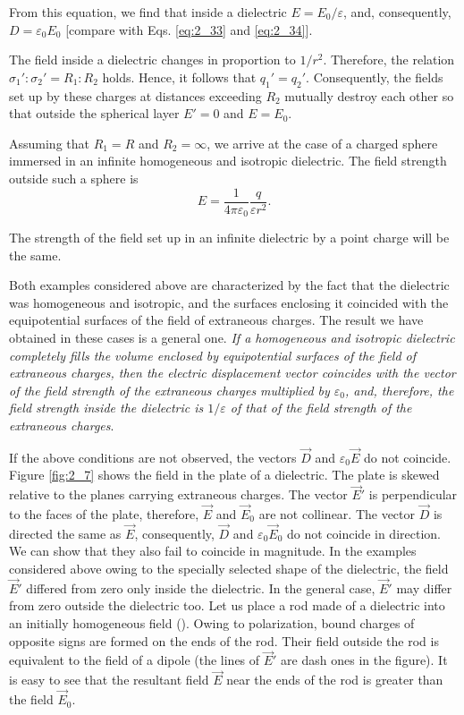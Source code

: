 \noindent
From this equation, we find that inside a dielectric $E=E_0/\varepsilon$, and, consequently, $D=\varepsilon_0E_0$ [compare with Eqs. \eqref{eq:2_33} and \eqref{eq:2_34}].

The field inside a dielectric changes in proportion to $1/r^2$. Therefore, the relation $\sigma_1' :\sigma_2' = R_1 : R_2$ holds. Hence, it follows that $q_1'=q_2'$. Consequently, the fields set up by these charges at distances exceeding $R_2$ mutually destroy each other so that outside the spherical layer $E'=0$ and $E=E_0$.

Assuming that $R_1=R$ and $R_2=\infty$, we arrive at the case of a charged sphere immersed in an infinite homogeneous and isotropic dielectric. The field strength outside such a sphere is
\begin{equation}\label{eq:2_41}
    E = \frac{1}{4\pi\varepsilon_0} \frac{q}{\varepsilon r^2}.
\end{equation}

\noindent
The strength of the field set up in an infinite dielectric by a point charge will be the same.

Both examples considered above are characterized by the fact that the dielectric was homogeneous and isotropic, and the surfaces enclosing it coincided with the equipotential surfaces of the field of extraneous charges. The result we have obtained in these cases is a general one. \textit{If a homogeneous and isotropic dielectric completely fills the volume enclosed by equipotential surfaces of the field of extraneous charges, then the electric displacement vector coincides with the vector of the field strength of the extraneous charges multiplied by $\varepsilon_0$, and, therefore, the field strength inside the dielectric is $1/\varepsilon$ of that of the field strength of the extraneous charges}.

If the above conditions are not observed, the vectors $\vec{D}$ and $\varepsilon_0\vec{E}$ do not coincide. Figure \ref{fig:2_7} shows the field in the plate of a dielectric. The plate is skewed relative to the planes carrying extraneous charges. The vector $\vec{E}'$ is perpendicular to the faces of the plate, therefore, $\vec{E}$ and $\vec{E}_0$ are not collinear. The vector $\vec{D}$ is directed the same as $\vec{E}$, consequently, $\vec{D}$ and $\varepsilon_0\vec{E}_0$ do not coincide in direction. We can show that they also fail to coincide in magnitude.
In the examples considered above owing to the specially selected shape of the dielectric, the field $\vec{E}'$ differed from zero only inside the dielectric. In the general case, $\vec{E}'$ may differ from zero outside the dielectric too. Let us place a rod made of a dielectric into an initially homogeneous field (). Owing to polarization, bound charges of opposite signs are formed on the ends of the rod. Their field outside the rod is equivalent to the field of a dipole (the lines of $\vec{E}'$ are dash ones in the figure). It is easy to see that the resultant field $\vec{E}$ near the ends of the rod is greater than the field $\vec{E}_0$.

